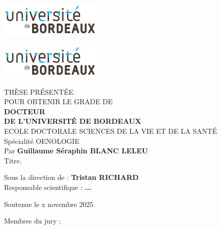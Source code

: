 
\pagestyle{empty}


\includegraphics[scale=1, height=1.7cm]{0_Liminaires/Images/UBX_logo.png}
\hfill

\includegraphics[scale=1, height=1.7cm]{0_Liminaires/Images/UBX_logo.png} %
\hfill

\begin{center}
\doublespacing
\begin{Large}

THÈSE PRÉSENTÉE\\ POUR OBTENIR LE GRADE DE \\
{\LARGE \textbf{DOCTEUR\\DE L'UNIVERSITÉ DE BORDEAUX} } \\
\vspace{0.55cm}
ECOLE DOCTORALE SCIENCES DE LA VIE ET DE LA SANTÉ\\
{\normalsize Spécialité OENOLOGIE} \\
\vspace{0.55cm}
Par \textbf{Guillaume Séraphin BLANC LELEU} \\
\vspace{0.55cm}
{\Large Titre.}
\end{Large}
\vspace{0.55cm}
\begin{normalsize}
\begin{singlespace}
Sous la direction de : \textbf{Tristan RICHARD}\\
Responsable scientifique : \textbf{...}
\end{singlespace}
\end{normalsize}
\end{center}
\vfill
\begin{center}
{\large Soutenue le x novembre 2025 }\\    
\end{center}
\vfill
Membres du jury :
\begin{table}[b]
\centering
{}
\end{table}

